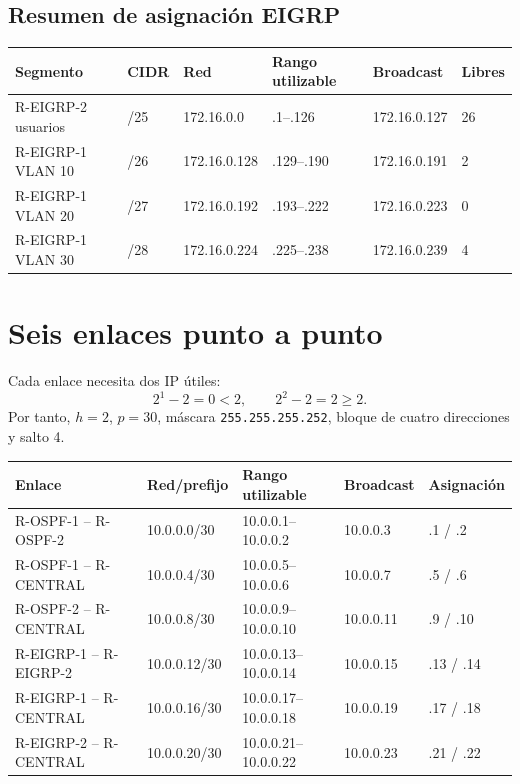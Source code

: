 \documentclass[11pt]{article}
\begin{document}
\subsection{Resumen de asignación EIGRP}
\begin{center}
\small
\begin{tabularx}{\textwidth}{Y C{1.1cm} l l l C{1.1cm}}
\toprule
Segmento & CIDR & Red & Rango utilizable & Broadcast & Libres\\
\midrule
R-EIGRP-2 usuarios & /25 & 172.16.0.0 & .1--.126 & 172.16.0.127 & 26\\
R-EIGRP-1 VLAN 10 & /26 & 172.16.0.128 & .129--.190 & 172.16.0.191 & 2\\
R-EIGRP-1 VLAN 20 & /27 & 172.16.0.192 & .193--.222 & 172.16.0.223 & 0\\
R-EIGRP-1 VLAN 30 & /28 & 172.16.0.224 & .225--.238 & 172.16.0.239 & 4\\
\bottomrule
\end{tabularx}
\end{center}

\section{Seis enlaces punto a punto}

Cada enlace necesita dos IP útiles:
\[
2^1-2=0<2,\qquad 2^2-2=2\ge2.
\]
Por tanto, $h=2$, $p=30$, máscara \texttt{255.255.255.252}, bloque de cuatro direcciones y salto 4.

\begin{center}
\small
\begin{longtable}{p{3.6cm}p{2.2cm}p{3.0cm}p{2.0cm}p{2.0cm}}
\toprule
Enlace & Red/prefijo & Rango utilizable & Broadcast & Asignación\\
\midrule
\endhead
R-OSPF-1 -- R-OSPF-2 & 10.0.0.0/30 & 10.0.0.1--10.0.0.2 & 10.0.0.3 & .1 / .2\\
R-OSPF-1 -- R-CENTRAL & 10.0.0.4/30 & 10.0.0.5--10.0.0.6 & 10.0.0.7 & .5 / .6\\
R-OSPF-2 -- R-CENTRAL & 10.0.0.8/30 & 10.0.0.9--10.0.0.10 & 10.0.0.11 & .9 / .10\\
R-EIGRP-1 -- R-EIGRP-2 & 10.0.0.12/30 & 10.0.0.13--10.0.0.14 & 10.0.0.15 & .13 / .14\\
R-EIGRP-1 -- R-CENTRAL & 10.0.0.16/30 & 10.0.0.17--10.0.0.18 & 10.0.0.19 & .17 / .18\\
R-EIGRP-2 -- R-CENTRAL & 10.0.0.20/30 & 10.0.0.21--10.0.0.22 & 10.0.0.23 & .21 / .22\\
\bottomrule
\end{longtable}
\end{center}
\end{document}
